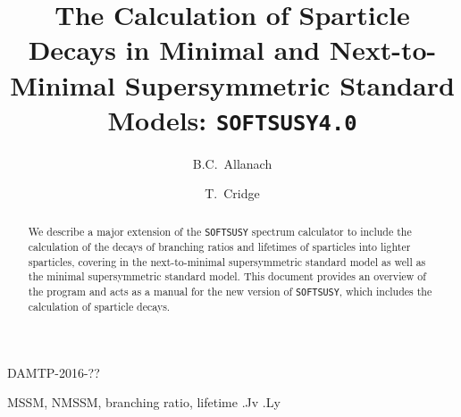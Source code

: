 \documentclass[final,3p,times,pdflatex]{elsarticle}
\begin{document}
\begin{frontmatter}

\begin{flushright}
DAMTP-2016-??\\
\end{flushright}

\title{The Calculation of Sparticle Decays in Minimal and Next-to-Minimal Supersymmetric Standard Models: {\tt SOFTSUSY4.0}}

\author[damtp]{B.C.~Allanach}
\author[damtp]{T.~Cridge}
\address[damtp]{DAMTP, CMS, University of Cambridge, Wilberforce road,
  Cambridge, CB3  0WA, United Kingdom}
\begin{abstract}
We describe a major extension of the {\tt SOFTSUSY} spectrum calculator to
include 
the calculation of the decays of branching ratios and lifetimes of sparticles
into lighter 
sparticles, covering in the next-to-minimal supersymmetric standard model as
well as the minimal supersymmetric standard model.
This document
provides an overview of the program and acts as a manual for the
new version of {\tt SOFTSUSY}, which includes the calculation of sparticle
decays. 
\end{abstract}

\begin{keyword}
MSSM, NMSSM, branching ratio, lifetime
.Jv
.Ly
\end{keyword}
\end{frontmatter}
\end{document}
